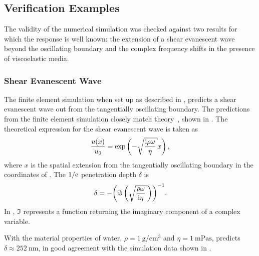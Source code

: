 \subsection{Verification Examples}
The validity of the numerical simulation was checked against two results
for which the response is well known: the extension of a shear evanescent
wave beyond the oscillating boundary and the complex frequency shifts in
the presence of viscoelastic media.

\subsubsection{Shear Evanescent Wave}
The finite element simulation when set up as described in
, predicts a shear evanescent wave out from
the tangentially oscillating boundary.  The predictions from the finite
element simulation closely match theory~\cite{steinem2007piezoelectric},
shown in .  The theoretical expression for the
shear evanescent wave is taken as~\cite{steinem2007piezoelectric}
\begin{equation}
  \frac{u(x)}{u_0} = \exp\left(-\sqrt{\frac{\mi \rho \omega}{\eta}} x\right),
\end{equation}
where $x$ is the spatial extension from the tangentially oscillating
boundary in the coordinates of .  The $1/{\mathrm{e}}$
penetration depth $\delta$ is
\begin{equation}
  \delta = -{\left(\Im\left(\sqrt{\frac{\rho\omega}{\mi\eta}}\right)\right)}^{-1}.
  \label{eqn:suppshearwavedelta}
\end{equation}
In , $\Im$ represents a function returning
the imaginary component of a complex variable.

With the material properties of water,
$\rho=\SI{1}{\gram\per\centi\meter\cubed}$ and
$\eta=\SI{1}{\milli\pascal\second}$, 
predicts $\delta\approx\SI{252}{\nano\meter}$, in good agreement with the
simulation data shown in .

